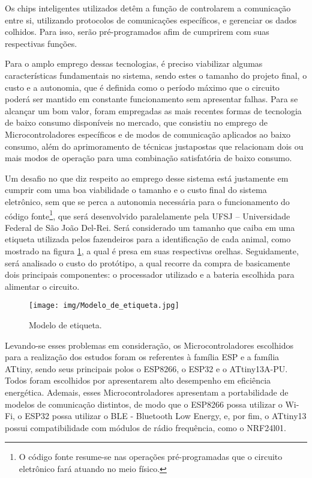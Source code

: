 {
Os chips inteligentes utilizados detêm a função de controlarem a comunicação entre si, utilizando protocolos de comunicações específicos, e gerenciar os dados colhidos. Para isso, serão pré-programados afim de cumprirem com suas respectivas funções.
}

{
Para o amplo emprego dessas tecnologias, é preciso viabilizar algumas características fundamentais no sistema, sendo estes o tamanho do projeto final, o custo e a autonomia, que é definida como o período máximo que o circuito poderá ser mantido em constante funcionamento sem apresentar falhas. Para se alcançar um bom valor, foram empregadas as mais recentes formas de tecnologia de baixo consumo disponíveis no mercado, que consistiu no emprego de Microcontroladores específicos e de modos de comunicação aplicados ao baixo consumo, além do aprimoramento de técnicas justapostas que relacionam dois ou mais modos de operação para uma combinação satisfatória de baixo consumo.
}

{
Um desafio no que diz respeito ao emprego desse sistema está justamente em cumprir com uma boa viabilidade o tamanho e o custo final do sistema eletrônico, sem que se perca a autonomia necessária para o funcionamento do código fonte\footnote{O código fonte resume-se nas operações pré-programadas que o circuito eletrônico fará atuando no meio físico.}, que será desenvolvido paralelamente pela UFSJ – Universidade Federal de São João Del-Rei. Será considerado um tamanho que caiba em uma etiqueta utilizada pelos fazendeiros para a identificação de cada animal, como mostrado na figura \ref{fig:modelo_etiqueta}, a qual é presa em suas respectivas orelhas. Seguidamente, será analisado o custo do protótipo, a qual recorre da compra de basicamente dois principais componentes: o processador utilizado e a bateria escolhida para alimentar o circuito.
}

\begin{figure}[htb]
    \centering
    \texttt{[image: img/Modelo\_de\_etiqueta.jpg]}
    \caption{Modelo de etiqueta.}
    \label{fig:modelo_etiqueta}
\end{figure}

{
Levando-se esses problemas em consideração, os Microcontroladores escolhidos para a realização dos estudos foram os referentes à família ESP e a família ATtiny, sendo seus principais polos o ESP8266, o ESP32 e o ATtiny13A-PU. Todos foram escolhidos por apresentarem alto desempenho em eficiência energética. Ademais, esses Microcontroladores apresentam a portabilidade de modelos de comunicação distintos, de modo que o ESP8266 possa utilizar o Wi-Fi, o ESP32 possa utilizar o BLE - Bluetooth Low Energy, e, por fim, o ATtiny13 possui compatibilidade com módulos de rádio frequência, como o NRF24l01.
}

